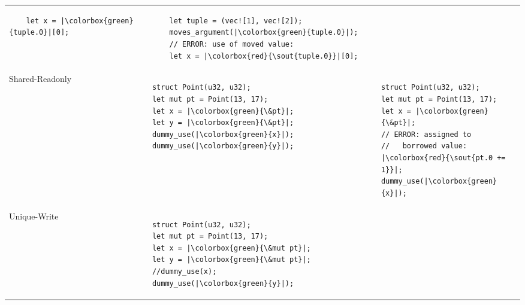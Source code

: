 \documentclass[a4paper,12pt,openright]{book}
\newcommand{\goodexample}[1]{\colorbox{green}{#1}}
\newcommand{\badexample}[1]{\colorbox{red}{\sout{#1}}}
\begin{document}
{\begin{table}[!htbp]
\begin{tabular}{p{} p{} p{}}
\begin{minipage}[t]{0.41\textwidth}
\begin{verbatim}
    let x = |\goodexample{tuple.0}|[0];
\end{verbatim}
		\end{minipage}            &                                                   %
		\begin{minipage}[t]{0.41\textwidth}
			\begin{verbatim}
    let tuple = (vec![1], vec![2]);
    moves_argument(|\goodexample{tuple.0}|);
    // ERROR: use of moved value:
    let x = |\badexample{tuple.0}|[0];
\end{verbatim}
		\end{minipage}                                                  \\
		Shared-Readonly                                             &                                     %
		\begin{minipage}[t]{0.41\textwidth}
			\begin{verbatim}
struct Point(u32, u32);
let mut pt = Point(13, 17);
let x = |\goodexample{\&pt}|;
let y = |\goodexample{\&pt}|;
dummy_use(|\goodexample{x}|); dummy_use(|\goodexample{y}|);
\end{verbatim}
		\end{minipage} &                                        %
		\begin{minipage}[t]{0.41\textwidth}
			\begin{verbatim}
struct Point(u32, u32);
let mut pt = Point(13, 17);
let x = |\goodexample{\&pt}|;
// ERROR: assigned to
//   borrowed value:
|\badexample{pt.0 += 1}|;
dummy_use(|\goodexample{x}|);
\end{verbatim}
		\end{minipage}                                                  \\
		Unique-Write                                                &                                     %
		\begin{minipage}[t]{0.41\textwidth}
			\begin{verbatim}
struct Point(u32, u32);
let mut pt = Point(13, 17);
let x = |\goodexample{\&mut pt}|;
let y = |\goodexample{\&mut pt}|;
//dummy_use(x);
dummy_use(|\goodexample{y}|);
\end{verbatim}
		\end{minipage}           &                                                  %

\end{tabular}
\end{table}}
\end{document}
